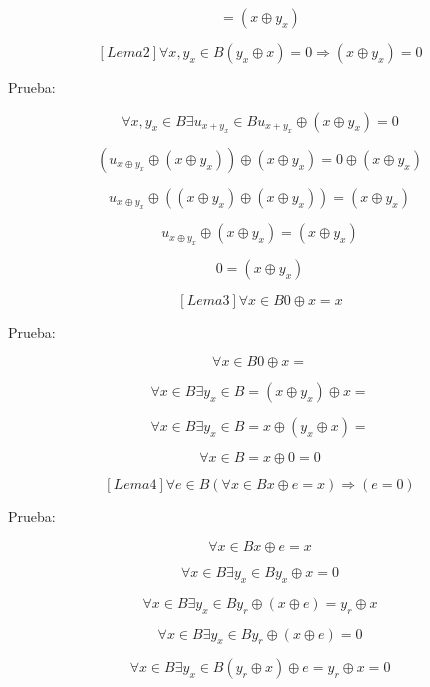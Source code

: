 \begin{enumerate}
\begin{enumerate}
\begin{enumerate}
      \[= \left( {x \oplus y_{x}} \right)\]

      \[\left\lbrack {{Lema}2} \right\rbrack\forall x,{y_{x} \in B}{\left( {y_{x} \oplus x} \right) = 0}\Rightarrow{\left( {x \oplus y_{x}} \right) = 0}\]

      Prueba:

      \[\forall x,{y_{x} \in B}\exists{u_{x + y_{x}} \in B}{{u_{x + y_{x}} \oplus \left( {x \oplus y_{x}} \right)} = 0}\]

      \[\left( {u_{x \oplus y_{x}} \oplus \left( {x \oplus y_{x}} \right)} \right) \oplus {\left( {x \oplus y_{x}} \right) = 0} \oplus \left( {x \oplus y_{x}} \right)\]

      \[u_{x \oplus y_{x}} \oplus {\left( {\left( {x \oplus y_{x}} \right) \oplus \left( {x \oplus y_{x}} \right)} \right) = \left( {x \oplus y_{x}} \right)}\]

      \[u_{x \oplus y_{x}} \oplus {\left( {x \oplus y_{x}} \right) = \left( {x \oplus y_{x}} \right)}\]

      \[0 = \left( {x \oplus y_{x}} \right)\]

      \[\left\lbrack {{Lema}3} \right\rbrack\forall{x \in B}0 \oplus {x = x}\]

      Prueba:

      \[\forall{x \in B}0 \oplus {x =}\]

      \[\forall{x \in B}\exists{y_{x} \in B}{= \left( {x \oplus y_{x}} \right)} \oplus {x =}\]

      \[\forall{x \in B}\exists{y_{x} \in B}{= x} \oplus {\left( {y_{x} \oplus x} \right) =}\]

      \[\forall{x \in B}{= x} \oplus {0 = 0}\]

      \[\left\lbrack {{Lema}4} \right\rbrack\forall{e \in B}\left( {\forall{x \in B}x \oplus {e = x}} \right)\Rightarrow\left( {e = 0} \right)\]

      Prueba:

      \[\forall{x \in B}x \oplus {e = x}\]

      \[\forall{x \in B}\exists{y_{x} \in B}y_{x} \oplus {x = 0}\]

      \[\forall{x \in B}\exists{y_{x} \in B}y_{r} \oplus {\left( {x \oplus e} \right) = y_{r}} \oplus x\]

      \[\forall{x \in B}\exists{y_{x} \in B}y_{r} \oplus {\left( {x \oplus e} \right) = 0}\]

      \[\forall{x \in B}\exists{y_{x} \in B}\left( {y_{r} \oplus x} \right) \oplus {e = y_{r}} \oplus {x = 0}\]


\end{enumerate}
\end{enumerate}
\end{enumerate}
